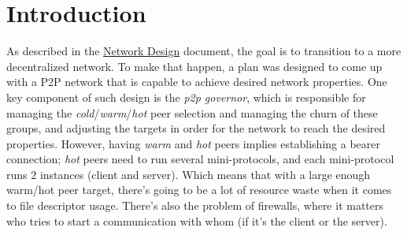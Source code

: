 \def\RemoteEstablished{\textsf{RemoteEstablished}}
\def\RemoteIdle{\textsf{RemoteIdle}\textsuperscript{$\tau$}}
\def\RemoteCold{\textsf{RemoteCold}}

\def\NewInboundConnection{\textsf{NewConnection Inbound}}
\def\NewOutboundConnection{\textsf{NewConnection Outbound}}
\def\NewConnectionAny{\textsf{NewConnection provenance}}
\def\AwakeRemote{\textsf{AwakeRemote}}
\def\RemoteToCold{\textsf{RemoteToCold}}
\def\CommitRemote{\textsf{CommitRemote}}

\def\cold{\textit{cold}}
\def\warm{\textit{warm}}
\def\hot{\textit{hot}}
\def\established{\textit{established}}

\def\keepAlive{\textsf{keep-alive}}
\def\tipSample{\textsf{tip-sample}}

\def\ptopgov{\textit{p2p governor}}
\def\mux{\textit{mux}}
\def\inbgov{\textit{inbound protocol governor}}
\def\Inbgov{\textit{Inbound protocol governor}}
\def\connmngr{\textit{connection manager}}
\def\Connmngr{\textit{Connection manager}}
\def\True{\texttt{True}}
\def\False{\texttt{False}}


\newcommand{\todoimpl}[1]{\todo[backgroundcolor=red,linecolor=red]{#1}}
\newenvironment{detail}
  {
    \begin{center}
    \begin{minipage}{0.9\textwidth}
      \begin{shaded}
      \small
      \noindent Implementation detail
      \vspace{0.3em}
      \newline
      \itshape
  }
  {
  \end{shaded}
  \end{minipage}
  \end{center}
  \vspace{1em}
  }

\section{Introduction}

As described in the \href{https://hydra.iohk.io/build/5866649/download/1/network-design.pdf}{Network Design} document, the goal is to transition to a more
decentralized network. To make that happen, a plan was designed to come up with a P2P
network that is capable to achieve desired network properties. One key component of
such design is the \ptopgov{}, which is responsible for managing the \cold{}/\warm{}/\hot{}
peer selection and managing the churn of these groups, and adjusting the targets in order for
the network to reach the desired properties. However, having \warm{} and \hot{} peers implies
establishing a bearer connection; \hot{} peers need to run several mini-protocols, and each
mini-protocol runs 2 instances (client and server). Which means that with a large enough
warm/hot peer target, there's going to be a lot of resource waste when it comes to file
descriptor usage. There's also the problem of firewalls, where it matters who tries to
start a communication with whom (if it's the client or the server).

